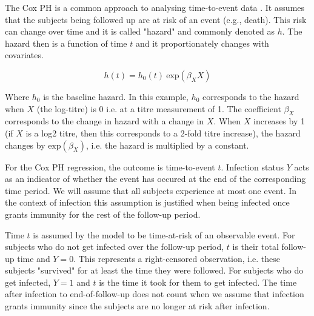 The Cox PH is a common approach to analysing time-to-event data \cite{George;2014}. It assumes that the subjects being followed up are at risk of an event (e.g., death). This risk can change over time and it is called "hazard" and commonly denoted as $h$. The hazard then is a function of time $t$ and it proportionately changes with covariates.

$$
h(t) = h_0(t) \ \text{exp}(\beta_XX)
$$

Where $h_0$ is the baseline hazard. In this example, $h_0$ corresponds to the hazard when $X$ (the log-titre) is 0 i.e. at a titre measurement of 1. The coefficient $\beta_X$ corresponds to the change in hazard with a change in $X$. When $X$ increases by 1 (if $X$ is a log2 titre, then this corresponds to a 2-fold titre increase), the hazard changes by $\text{exp}(\beta_X)$, i.e. the hazard is multiplied by a constant.

For the Cox PH regression, the outcome is time-to-event $t$. Infection status $Y$ acts as an indicator of whether the event has occured at the end of the corresponding time period. We will assume that all subjects experience at most one event. In the context of infection this assumption is justified when being infected once grants immunity for the rest of the follow-up period.

Time $t$ is assumed by the model to be time-at-risk of an observable event. For subjects who do not get infected over the follow-up period, $t$ is their total follow-up time and $Y=0$. This represents a right-censored observation, i.e. these subjects "survived" for at least the time they were followed. For subjects who do get infected, $Y=1$ and $t$ is the time it took for them to get infected. The time after infection to end-of-follow-up does not count when we assume that infection grants immunity since the subjects are no longer at risk after infection.
